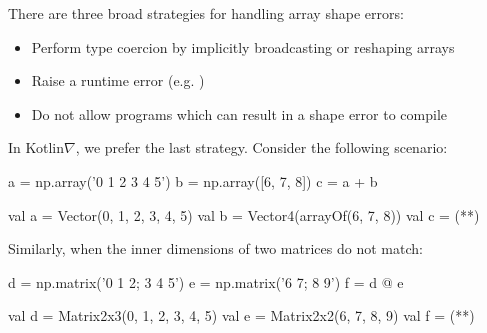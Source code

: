 \documentclass[portrait,a0b,final,a4resizeable]{a0poster}
\begin{document}
\begin{poster}
\begin{multicols}{2}
\begin{minipage}[c]{0.85\columnwidth}
      There are three broad strategies for handling array shape errors:
      \begin{itemize}[leftmargin=1in]
        \item Perform type coercion by implicitly broadcasting or reshaping arrays
        \item Raise a runtime error (e.g. )
        \item Do not allow programs which can result in a shape error to compile
      \end{itemize}

      In Kotlin$\nabla$, we prefer the last strategy. Consider the following scenario:
      \end{minipage}

\null\hspace*{2cm}\begin{minipage}[c]{0.40\columnwidth}
\begin{pythonlisting}
a = np.array('0 1 2 3 4 5')
b = np.array([6, 7, 8])
c = a + b
\end{pythonlisting}
\end{minipage}
\null\hspace*{2cm}\begin{minipage}[c]{0.45\columnwidth}
\begin{kotlinlisting}
val a = Vector(0, 1, 2, 3, 4, 5)
val b = Vector4(arrayOf(6, 7, 8))
val c = (**)
\end{kotlinlisting}
\end{minipage}

\null\hspace*{3cm}\begin{minipage}[c]{0.85\columnwidth}
Similarly, when the inner dimensions of two matrices do not match:
\end{minipage}

\vspace*{-1cm}
\null\hspace*{2cm}\begin{minipage}[c]{0.40\columnwidth}
\begin{pythonlisting}
d = np.matrix('0 1 2; 3 4 5')
e = np.matrix('6 7; 8 9')
f = d @ e
                          \end{pythonlisting}
      \end{minipage}
      \null\hspace*{2cm}\begin{minipage}[c]{0.42\columnwidth}
                          \begin{kotlinlisting}
val d = Matrix2x3(0, 1, 2, 3, 4, 5)
val e = Matrix2x2(6, 7, 8, 9)
val f = (**)
                          \end{kotlinlisting}
      \end{minipage}


\end{multicols}
\end{poster}
\end{document}
